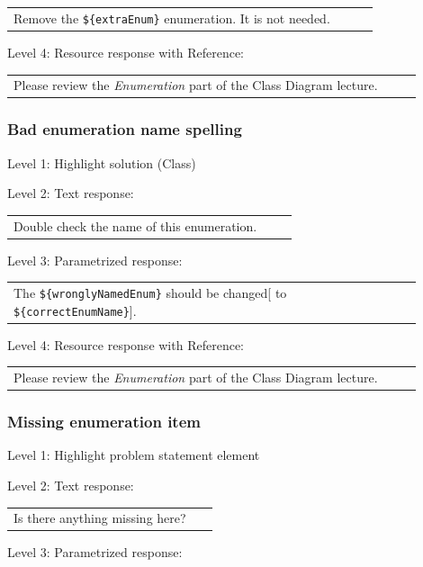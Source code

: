 \begin{tabular}{|p{0.9\linewidth}}
Remove the \verb|${extraEnum}| enumeration. It is not needed.
\end{tabular} \medskip

\noindent Level 4: Resource response with Reference: \medskip

\begin{tabular}{|p{0.9\linewidth}}
Please review the \textit{Enumeration} part of the Class Diagram lecture.
\end{tabular} \medskip


\subsubsection{Bad enumeration name spelling}

\noindent Level 1: Highlight solution (Class) \medskip

\noindent Level 2: Text response: \medskip

\begin{tabular}{|p{0.9\linewidth}}
Double check the name of this enumeration.
\end{tabular} \medskip

\noindent Level 3: Parametrized response: \medskip

\begin{tabular}{|p{0.9\linewidth}}
The \verb|${wronglyNamedEnum}| should be changed[ to \verb|${correctEnumName}|].
\end{tabular} \medskip

\noindent Level 4: Resource response with Reference: \medskip

\begin{tabular}{|p{0.9\linewidth}}
Please review the \textit{Enumeration} part of the Class Diagram lecture.
\end{tabular} \medskip


\subsubsection{Missing enumeration item}

\noindent Level 1: Highlight problem statement element \medskip

\noindent Level 2: Text response: \medskip

\begin{tabular}{|p{0.9\linewidth}}
Is there anything missing here?
\end{tabular} \medskip

\noindent Level 3: Parametrized response: \medskip

